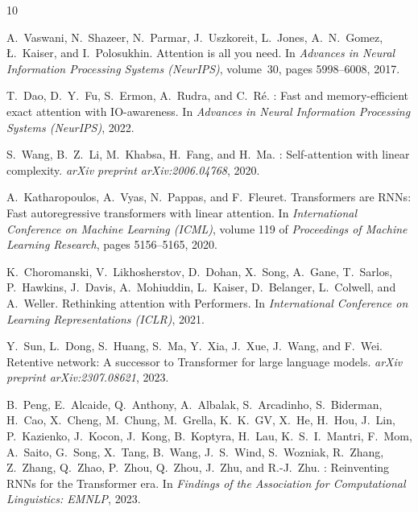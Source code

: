 \documentclass{article}
\begin{document}

\begin{thebibliography}{10}

A.~Vaswani, N.~Shazeer, N.~Parmar, J.~Uszkoreit, L.~Jones, A.~N.~Gomez, {\L}.~Kaiser, and I.~Polosukhin.
\newblock Attention is all you need.
\newblock In \emph{Advances in Neural Information Processing Systems (NeurIPS)}, volume~30, pages 5998--6008, 2017.

T.~Dao, D.~Y.~Fu, S.~Ermon, A.~Rudra, and C.~R\'{e}.
: Fast and memory-efficient exact attention with {IO}-awareness.
\newblock In \emph{Advances in Neural Information Processing Systems (NeurIPS)}, 2022.

S.~Wang, B.~Z.~Li, M.~Khabsa, H.~Fang, and H.~Ma.
: Self-attention with linear complexity.
\newblock \emph{arXiv preprint arXiv:2006.04768}, 2020.

A.~Katharopoulos, A.~Vyas, N.~Pappas, and F.~Fleuret.
\newblock Transformers are {RNNs}: Fast autoregressive transformers with linear attention.
\newblock In \emph{International Conference on Machine Learning (ICML)}, volume 119 of \emph{Proceedings of Machine Learning Research}, pages 5156--5165, 2020.

K.~Choromanski, V.~Likhosherstov, D.~Dohan, X.~Song, A.~Gane, T.~Sarlos, P.~Hawkins, J.~Davis, A.~Mohiuddin, L.~Kaiser, D.~Belanger, L.~Colwell, and A.~Weller.
\newblock Rethinking attention with {Performers}.
\newblock In \emph{International Conference on Learning Representations (ICLR)}, 2021.

Y.~Sun, L.~Dong, S.~Huang, S.~Ma, Y.~Xia, J.~Xue, J.~Wang, and F.~Wei.
\newblock Retentive network: A successor to {Transformer} for large language models.
\newblock \emph{arXiv preprint arXiv:2307.08621}, 2023.

B.~Peng, E.~Alcaide, Q.~Anthony, A.~Albalak, S.~Arcadinho, S.~Biderman, H.~Cao, X.~Cheng, M.~Chung, M.~Grella, K.~K.~GV, X.~He, H.~Hou, J.~Lin, P.~Kazienko, J.~Kocon, J.~Kong, B.~Koptyra, H.~Lau, K.~S.~I.~Mantri, F.~Mom, A.~Saito, G.~Song, X.~Tang, B.~Wang, J.~S.~Wind, S.~Wozniak, R.~Zhang, Z.~Zhang, Q.~Zhao, P.~Zhou, Q.~Zhou, J.~Zhu, and R.-J.~Zhu.
: Reinventing {RNN}s for the {Transformer} era.
\newblock In \emph{Findings of the Association for Computational Linguistics: EMNLP}, 2023.


\end{thebibliography}
\end{document}

